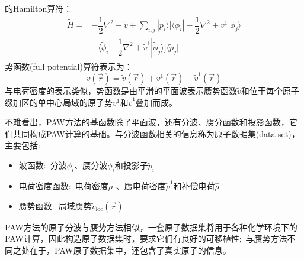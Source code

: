 的\textrm{Hamilton}算符：
\begin{equation}
	\begin{aligned}
		\tilde H=&-\dfrac12\nabla^2+\tilde v+\sum_{i,j}|\tilde p_i\rangle\bigg[\langle\phi_i|-\dfrac12\nabla^2+v^1|\phi_j\rangle\\
			&-\langle\tilde\phi_i|-\dfrac12\nabla^2+\tilde v^1|\tilde\phi_j\rangle\bigg]\langle\tilde p_j| 
	\end{aligned}
	\label{eq:PAW-Blochl-15}
\end{equation}
势函数\textrm{(full potential)}算符表示为：
\begin{equation}
	v(\vec r)=\tilde v(\vec r)+v^1(\vec r)-\tilde v^1(\vec r)
	\label{eq:PAW-Blochl-16}
\end{equation}
与电荷密度的表示类似，势函数是由平滑的平面波表示赝势函数$\tilde v$和位于每个原子缀加区的单中心局域的原子势$v^1$和$\tilde v^1$叠加而成。%

不难看出，\textrm{PAW}方法的基函数除了平面波，还有分波、赝分函数和投影函数，它们共同构成\textrm{PAW}计算的基础。与分波函数相关的信息称为原子数据集(data set)，主要包括:
	\begin{itemize}
		\item 波函数:~分波$\phi_i$、赝分波$\tilde\phi_i$和投影子$\tilde p_i$
		\item 电荷密度函数:~电荷密度$\rho^1$、赝电荷密度$\tilde\rho^1$和补偿电荷$\hat\rho$
		\item 赝势函数:~局域赝势$\tilde v_{\mathrm{loc}}(\vec r)$
	\end{itemize}
\textrm{PAW}方法的原子分波与赝势方法相似，一套原子数据集将用于各种化学环境下的\textrm{PAW}计算，因此构造原子数据集时，要求它们有良好的可移植性;~与赝势方法不同之处在于，\textrm{PAW}原子数据集中，还包含了真实原子的信息。

